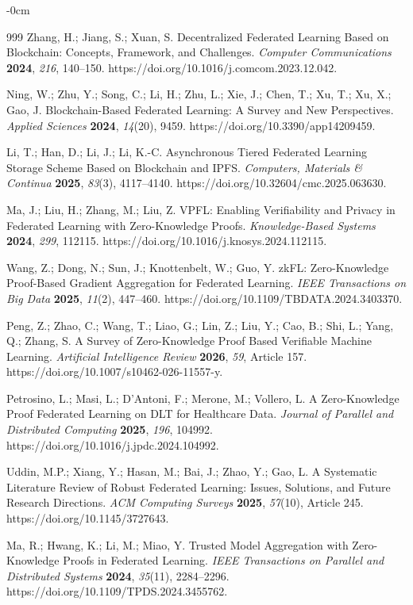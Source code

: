 \documentclass[futureinternet,article,submit,pdftex,moreauthors]{Definitions/mdpi}
\begin{document}
\begin{adjustwidth}{-\extralength}{0cm}
\begin{thebibliography}{999}
Zhang, H.; Jiang, S.; Xuan, S.
Decentralized Federated Learning Based on Blockchain: Concepts, Framework, and Challenges.
\textit{Computer Communications} \textbf{2024}, \textit{216}, 140--150.
https://doi.org/10.1016/j.comcom.2023.12.042.

Ning, W.; Zhu, Y.; Song, C.; Li, H.; Zhu, L.; Xie, J.; Chen, T.; Xu, T.; Xu, X.; Gao, J.
Blockchain-Based Federated Learning: A Survey and New Perspectives.
\textit{Applied Sciences} \textbf{2024}, \textit{14}(20), 9459.
https://doi.org/10.3390/app14209459.

Li, T.; Han, D.; Li, J.; Li, K.-C.
Asynchronous Tiered Federated Learning Storage Scheme Based on Blockchain and IPFS.
\textit{Computers, Materials \& Continua} \textbf{2025}, \textit{83}(3), 4117--4140.
https://doi.org/10.32604/cmc.2025.063630.

Ma, J.; Liu, H.; Zhang, M.; Liu, Z.
VPFL: Enabling Verifiability and Privacy in Federated Learning with Zero-Knowledge Proofs.
\textit{Knowledge-Based Systems} \textbf{2024}, \textit{299}, 112115.
https://doi.org/10.1016/j.knosys.2024.112115.

Wang, Z.; Dong, N.; Sun, J.; Knottenbelt, W.; Guo, Y.
zkFL: Zero-Knowledge Proof-Based Gradient Aggregation for Federated Learning.
\textit{IEEE Transactions on Big Data} \textbf{2025}, \textit{11}(2), 447--460.
https://doi.org/10.1109/TBDATA.2024.3403370.

Peng, Z.; Zhao, C.; Wang, T.; Liao, G.; Lin, Z.; Liu, Y.; Cao, B.; Shi, L.; Yang, Q.; Zhang, S.
A Survey of Zero-Knowledge Proof Based Verifiable Machine Learning.
\textit{Artificial Intelligence Review} \textbf{2026}, \textit{59}, Article 157.
https://doi.org/10.1007/s10462-026-11557-y.

Petrosino, L.; Masi, L.; D'Antoni, F.; Merone, M.; Vollero, L.
A Zero-Knowledge Proof Federated Learning on DLT for Healthcare Data.
\textit{Journal of Parallel and Distributed Computing} \textbf{2025}, \textit{196}, 104992.
https://doi.org/10.1016/j.jpdc.2024.104992.

Uddin, M.P.; Xiang, Y.; Hasan, M.; Bai, J.; Zhao, Y.; Gao, L.
A Systematic Literature Review of Robust Federated Learning: Issues, Solutions, and Future Research Directions.
\textit{ACM Computing Surveys} \textbf{2025}, \textit{57}(10), Article 245.
https://doi.org/10.1145/3727643.

Ma, R.; Hwang, K.; Li, M.; Miao, Y.
Trusted Model Aggregation with Zero-Knowledge Proofs in Federated Learning.
\textit{IEEE Transactions on Parallel and Distributed Systems} \textbf{2024}, \textit{35}(11), 2284--2296.
https://doi.org/10.1109/TPDS.2024.3455762.


\end{thebibliography}
\end{adjustwidth}
\end{document}

